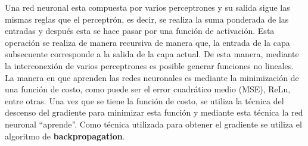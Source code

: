 Una red neuronal esta compuesta por varios perceptrones y su salida sigue las mismas reglas que el
perceptrón, es decir, se realiza la suma ponderada de las entradas y después esta se hace pasar por una
función de activación. Esta operación se realiza de manera recursiva de manera que, la entrada de la capa
subsecuente corresponde a la salida de la capa actual. De esta manera, mediante la interconexión de
varios perceptrones es posible generar funciones no lineales.\\
La manera en que aprenden las redes neuronales es mediante la minimización de una función de costo, como
puede ser el error cuadrático medio (MSE), ReLu, entre otras. Una vez que se tiene la función de costo,
se utiliza la técnica del descenso del gradiente para minimizar esta función y mediante esta técnica la
red neuronal ``aprende''. Como técnica utilizada para obtener el gradiente se utiliza el algoritmo de
\textbf{backpropagation}.